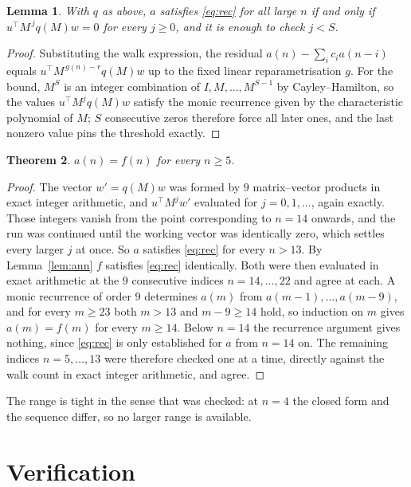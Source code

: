 \documentclass[11pt,a4paper]{article}
\theoremstyle{plain}
\newtheorem{theorem}{Theorem}
\newtheorem{lemma}[theorem]{Lemma}
\theoremstyle{definition}
\begin{document}
\begin{lemma}\label{lem:crit}
With $q$ as above, $a$ satisfies \eqref{eq:rec} for all large $n$ if and only if
$u^{\!\top}M^{\,j}q(M)w=0$ for every $j\ge0$, and it is enough to check $j<S$.
\end{lemma}

\begin{proof}
Substituting the walk expression, the residual $a(n)-\sum_ic_ia(n-i)$ equals
$u^{\!\top}M^{\,g(n)-r}q(M)w$ up to the fixed linear reparametrisation $g$. For the bound,
$M^{S}$ is an integer combination of $I,M,\dots,M^{S-1}$ by Cayley--Hamilton, so the values
$u^{\!\top}M^{j}q(M)w$ satisfy the monic recurrence given by the characteristic polynomial of
$M$; $S$ consecutive zeros therefore force all later ones, and the last nonzero value pins the
threshold exactly.
\end{proof}

\begin{theorem}
$a(n)=f(n)$ for every $n\ge5$.
\end{theorem}

\begin{proof}
The vector $w'=q(M)w$ was formed by $9$ matrix--vector products in exact integer
arithmetic, and $u^{\!\top}M^{j}w'$ evaluated for $j=0,1,\dots$, again exactly. Those integers
vanish from the point corresponding to $n=14$ onwards, and the run was continued until the
working vector was identically zero, which settles every larger $j$ at once. So $a$ satisfies
\eqref{eq:rec} for every $n>13$. By Lemma~\ref{lem:ann} $f$ satisfies \eqref{eq:rec}
identically. Both were then evaluated in exact arithmetic at the $9$ consecutive indices
$n=14,\dots,22$ and agree at each. A monic recurrence of order $9$
determines $a(m)$ from $a(m-1),\dots,a(m-9)$, and for every $m\ge23$ both
$m>13$ and $m-9\ge14$ hold, so induction on $m$ gives $a(m)=f(m)$ for every
$m\ge14$.
Below $n=14$ the recurrence argument gives nothing, since \eqref{eq:rec} is only
established for $a$ from $n=14$ on. The remaining indices $n=5,\dots,13$ were
therefore checked one at a time, directly against the walk count in exact integer arithmetic,
and agree.
\end{proof}

The range is tight in the sense that was checked: at $n=4$ the closed form and the sequence differ, so no larger range is available.

\section{Verification}
\end{document}
